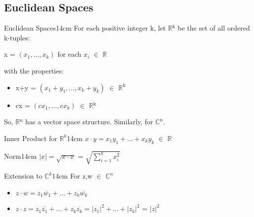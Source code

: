 	\newpage





\subsection{ Euclidean Spaces }

	\begin{definition}{Euclidean Spaces}{14cm}
		For each positive integer k, let $\mathbb{R}$$^\text{k}$ be the set of all ordered k-tuples:

		\hspace{0.5cm}
		x = $(x_1,...,x_k)$
		\hspace{1cm}
		for each $x_i$ $\in$ $\mathbb{R}$

		with the properties:
		\begin{itemize}[leftmargin=1cm, itemsep=0.1cm]
			\item x+y = $(x_1+y_1,...,x_k+y_k)$ $\in$ $\mathbb{R}^{\text{k}}$
		
			\item cx = $(cx_1,...,cx_k)$ $\in$ $\mathbb{R}$$^\text{k}$
		\end{itemize}

		So, $\mathbb{R}$$^\text{n}$ has a vector space structure.
		Similarly, for $\mathbb{C}^{\text{n}}$.
	\end{definition}

	\vspace{0.5cm}



	\begin{definition}{Inner Product for $\mathbb{R}^k$}{14cm}
		$x \cdot y = x_1y_1 + ... + x_ky_k$ $\in$ $\mathbb{R}$
	\end{definition}

	\vspace{0.5cm}



	\begin{definition}{Norm}{14cm}
		$|x| = \sqrt{x \cdot x}$ = $\sqrt{\sum_{i=1}^k x_i^2}$
	\end{definition}

	\vspace{0.5cm}



	\begin{definition}{Extension to $\mathbb{C}^k$}{14cm}
		For z,w $\in$ $\mathbb{C}^n$
		
		\begin{itemize}[leftmargin=1cm, itemsep=0.1cm]
			\item $z \cdot w = z_1\overline{w_1} + ... + z_k\overline{w_k}$
		
			\item $z \cdot z = z_1\overline{z_1} + ... + z_k\overline{z_k}
				= |z_1|^2 + ... + |z_k|^2$ = $|z|^2$
		\end{itemize}
	\end{definition}

